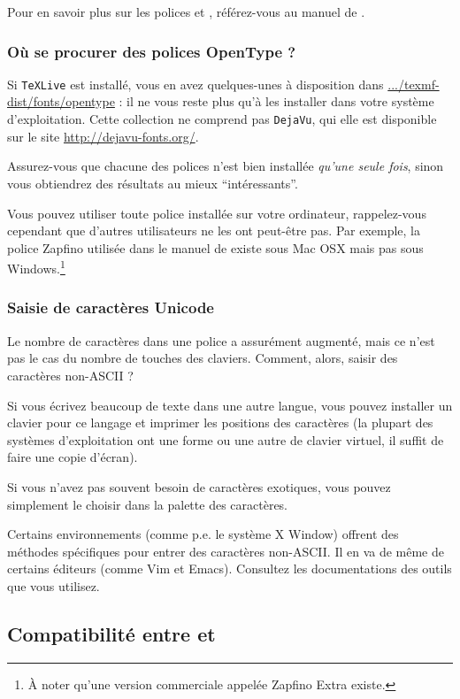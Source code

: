 Pour en savoir plus sur les polices et , référez-vous
au manuel de .

\subsubsection{Où se procurer des polices OpenType ?}

Si \texttt{TeXLive} est installé, vous en avez quelques-unes à
disposition dans \url{.../texmf-dist/fonts/opentype} : il ne vous
reste plus qu'à les installer dans votre système d'exploitation. Cette
collection ne comprend pas \texttt{DejaVu}, qui elle est disponible
sur le site \url{http://dejavu-fonts.org/}.

Assurez-vous que chacune des polices n'est bien installée \emph{qu'une
  seule fois}, sinon vous obtiendrez des résultats au mieux
\enquote{intéressants}.

Vous pouvez utiliser toute police installée sur votre ordinateur,
rappelez-vous cependant que d'autres utilisateurs ne les ont peut-être
pas. Par exemple, la police Zapfino utilisée dans le manuel de
 existe sous Mac OSX mais pas sous Windows.\footnote{À
  noter qu'une version commerciale appelée Zapfino Extra existe.}

\subsubsection{Saisie de caractères Unicode}

Le nombre de caractères dans une police a assurément augmenté, mais ce
n'est pas le cas du nombre de touches des claviers. Comment, alors,
saisir des caractères non-ASCII ?

Si vous écrivez beaucoup de texte dans une autre langue, vous pouvez
installer un clavier pour ce langage et imprimer les positions des
caractères (la plupart des systèmes d'exploitation ont une forme ou
une autre de clavier virtuel, il suffit de faire une copie d'écran).

Si vous n'avez pas souvent besoin de caractères exotiques, vous pouvez
simplement le choisir dans la palette des caractères.

Certains environnements (comme p.e. le système X Window) offrent des
méthodes spécifiques pour entrer des caractères non-ASCII. Il en va de
même de certains éditeurs (comme Vim et Emacs). Consultez les
documentations des outils que vous utilisez.

\subsection{Compatibilité entre  et }
\label{sec:comp-entre-holog}

